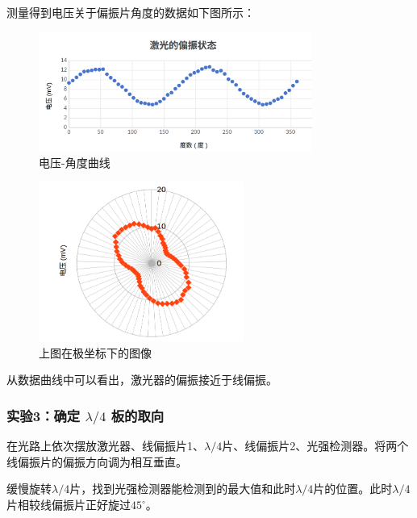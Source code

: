\documentclass{ctexart}
\begin{document}
测量得到电压关于偏振片角度的数据如下图所示：
\begin{figure}[H]
    \centering
    \includegraphics[width=0.8\textwidth]{实验二.png}
    \caption{电压-角度曲线}
\end{figure}
\begin{figure}[H]
    \centering
    \includegraphics[width=0.6\textwidth]{实验二-2.png}
    \caption{上图在极坐标下的图像}
\end{figure}

从数据曲线中可以看出，激光器的偏振接近于线偏振。

\subsubsection{实验3：确定 $\lambda/4$ 板的取向}
在光路上依次摆放激光器、线偏振片1、$\lambda/4$片、线偏振片2、光强检测器。将两个线偏振片的偏振方向调为相互垂直。

缓慢旋转$\lambda/4$片，找到光强检测器能检测到的最大值和此时$\lambda/4$片的位置。此时$\lambda/4$片相较线偏振片正好旋过$45^\circ$。
\end{document}
